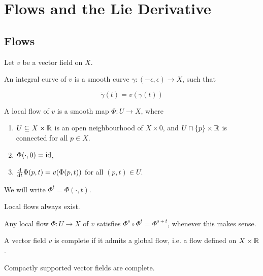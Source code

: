 \section{Flows and the Lie Derivative}

\subsection{Flows}

Let \(v\) be a vector field on \(X\).

\begin{definition}
     An integral curve of \(v\) is a smooth curve \(\gamma : (-\epsilon, \epsilon) \to X\), such that

    \[\dot\gamma(t) = v(\gamma(t))\]
\end{definition}

\begin{definition}

    A local flow of \(v\) is a smooth map \(\Phi : U \to X\), where

    \begin{enumerate}
        \item \(U \subseteq X \times \mathbb{R}\) is an open neighbourhood of \(X \times 0\), and \(U \cap \{p\} \times \mathbb{R}\) is connected for all \(p \in X\).
        \item \(\Phi(\cdot, 0) = \operatorname{id}\),
        \item \(\dv{t}\Phi(p, t) = v(\Phi(p, t))\) for all \((p, t) \in U\).
    \end{enumerate}

    We will write \(\Phi^t = \Phi(\cdot, t)\).
\end{definition}

\begin{lemma}
    Local flows always exist.
\end{lemma}

\begin{lemma}
    Any local flow \(\Phi : U \to X\) of \(v\) satisfies \(\Phi^s \circ \Phi^t = \Phi^{s + t}\), whenever this makes sense.
\end{lemma}

\begin{definition}

    A vector field \(v\) is complete if it admits a global flow, i.e. a flow defined on \(X \times \mathbb{R}\).
\end{definition}

\begin{lemma}
    Compactly supported vector fields are complete.
\end{lemma}

